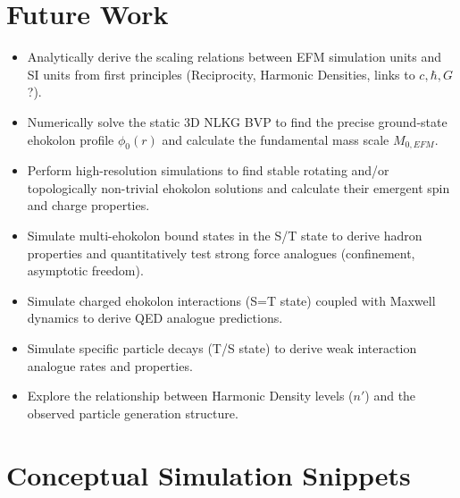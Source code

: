 \documentclass[11pt]{article}
\begin{document}
\section{Future Work}
\begin{itemize}
    \item Analytically derive the scaling relations between EFM simulation units and SI units from first principles (Reciprocity, Harmonic Densities, links to \(c, \hbar, G\)?).
    \item Numerically solve the static 3D NLKG BVP to find the precise ground-state ehokolon profile \(\phi_0(r)\) and calculate the fundamental mass scale \(M_{0, EFM}\).
    \item Perform high-resolution simulations to find stable rotating and/or topologically non-trivial ehokolon solutions and calculate their emergent spin and charge properties.
    \item Simulate multi-ehokolon bound states in the S/T state to derive hadron properties and quantitatively test strong force analogues (confinement, asymptotic freedom).
    \item Simulate charged ehokolon interactions (S=T state) coupled with Maxwell dynamics to derive QED analogue predictions.
    \item Simulate specific particle decays (T/S state) to derive weak interaction analogue rates and properties.
    \item Explore the relationship between Harmonic Density levels (\(n'\)) and the observed particle generation structure.
\end{itemize}


\appendix
\section{Conceptual Simulation Snippets}
\end{document}
